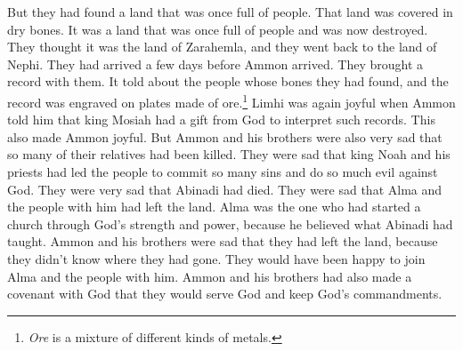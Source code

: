 But they had found a land that was once full of people. That land was covered in dry bones. It was a land that was once full of people and was now destroyed. They thought it was the land of Zarahemla, and they went back to the land of Nephi. They had arrived a few days before Ammon arrived.
\bverse \iffalse And they brought a record with them, even a record of the people whose bones they had found; and it was engraven on plates of ore. \fi
They brought a record with them. It told about the people whose bones they had found, and the record was engraved on plates made of ore.\footnote{\textit{Ore} is a mixture of different kinds of metals.}
\bverse \iffalse And now Limhi was again filled with joy in learning from the mouth of Ammon that king Mosiah had a gift from God, whereby he could interpret such engravings; yea, and Ammon also did rejoice. \fi
Limhi was again joyful when Ammon told him that king Mosiah had a gift from God to interpret such records. This also made Ammon joyful.
\bverse \iffalse Yet Ammon and his brethren were filled with sorrow because so many of their brethren had been slain; \fi
But Ammon and his brothers were also very sad that so many of their relatives had been killed.
\bverse \iffalse And also that king Noah and his priests had caused the people to commit so many sins and iniquities against God; and they also did mourn for the death of Abinadi; and also for the departure of Alma and the people that went with him, who had formed a church of God through the strength and power of God, and faith on the words which had been spoken by Abinadi. \fi
They were sad that king Noah and his priests had led the people to commit so many sins and do so much evil against God. They were very sad that Abinadi had died. They were sad that Alma and the people with him had left the land. Alma was the one who had started a church through God's strength and power, because he believed what Abinadi had taught. 
\bverse \iffalse Yea, they did mourn for their departure, for they knew not whither they had fled. Now they would have gladly joined with them, for they themselves had entered into a covenant with God to serve him and keep his commandments. \fi
Ammon and his brothers were sad that they had left the land, because they didn't know where they had gone. They would have been happy to join Alma and the people with him. Ammon and his brothers had also made a covenant with God that they would serve God and keep God's commandments.
\bverse \iffalse And now since the coming of Ammon, king Limhi had also entered into a covenant with God, and also many of his people, to serve him and keep his commandments. \fi
